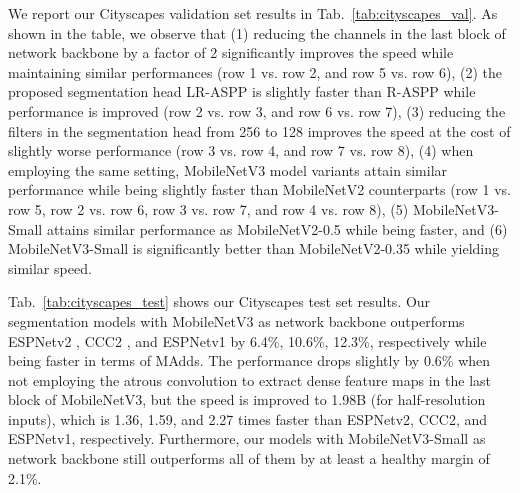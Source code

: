 \documentclass[10pt,twocolumn,letterpaper]{article}
\begin{document}
We report our Cityscapes validation set results in Tab.~\ref{tab:cityscapes_val}. As shown in the table, we observe that (1) reducing the channels in the last block of network backbone by a factor of 2 significantly improves the speed while maintaining similar performances (row 1 vs. row 2, and row 5 vs. row 6), (2) the proposed segmentation head LR-ASPP is slightly faster than R-ASPP \cite{mobilenetv2} while performance is improved (row 2 vs. row 3, and row 6 vs. row 7), (3) reducing the filters in the segmentation head from 256 to 128 improves the speed at the cost of slightly worse performance (row 3 vs. row 4, and row 7 vs. row 8), (4) when employing the same setting, MobileNetV3 model variants attain similar performance while being slightly faster than MobileNetV2 counterparts (row 1 vs. row 5, row 2 vs. row 6, row 3 vs. row 7, and row 4 vs. row 8), (5) MobileNetV3-Small attains similar performance as MobileNetV2-0.5 while being faster, and (6) MobileNetV3-Small is significantly better than MobileNetV2-0.35 while yielding similar speed.



Tab.~\ref{tab:cityscapes_test} shows our Cityscapes test set results. Our segmentation models with MobileNetV3 as network backbone outperforms ESPNetv2 \cite{DBLP:journals/corr/abs-1811-11431}, CCC2 \cite{DBLP:journals/corr/abs-1812-04920}, and ESPNetv1 \cite{DBLP:journals/corr/abs-1811-11431} by 6.4\%, 10.6\%, 12.3\%, respectively while being faster in terms of MAdds. The performance drops slightly by 0.6\% when not employing the atrous convolution to extract dense feature maps in the last block of MobileNetV3, but the speed is improved to 1.98B (for half-resolution inputs), which is 1.36, 1.59, and 2.27 times faster than ESPNetv2, CCC2, and ESPNetv1, respectively. Furthermore, our models with MobileNetV3-Small as network backbone still outperforms all of them by at least a healthy margin of 2.1\%. 
\end{document}
